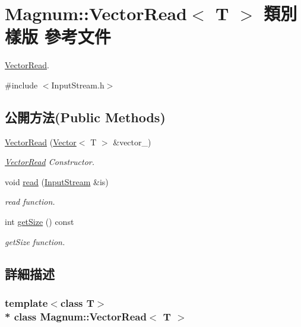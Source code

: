 \hypertarget{class_magnum_1_1_vector_read}{}\section{Magnum\+:\+:Vector\+Read$<$ T $>$ 類別 樣版 參考文件}
\label{class_magnum_1_1_vector_read}


\hyperlink{class_magnum_1_1_vector_read}{Vector\+Read}.  




{\ttfamily \#include $<$Input\+Stream.\+h$>$}

\subsection*{公開方法(Public Methods)}
\begin{DoxyCompactItemize}
\item 
\hyperlink{class_magnum_1_1_vector_read_a142de33b4e2e2a5f44930204be9c8f56}{Vector\+Read} (\hyperlink{class_magnum_1_1_vector}{Vector}$<$ T $>$ \&vector\+\_\+)
\begin{DoxyCompactList}\small\item\em \hyperlink{class_magnum_1_1_vector_read}{Vector\+Read} Constructor. \end{DoxyCompactList}\item 
void \hyperlink{class_magnum_1_1_vector_read_a9b27a68c51b6dbf396a25b753bbfbf7a}{read} (\hyperlink{class_magnum_1_1_input_stream}{Input\+Stream} \&is)
\begin{DoxyCompactList}\small\item\em read function. \end{DoxyCompactList}\item 
int \hyperlink{class_magnum_1_1_vector_read_a53cbc8a5baaefef7a6df405af73cc36f}{get\+Size} () const 
\begin{DoxyCompactList}\small\item\em get\+Size function. \end{DoxyCompactList}\end{DoxyCompactItemize}


\subsection{詳細描述}
\subsubsection*{template$<$class T$>$\\*
class Magnum\+::\+Vector\+Read$<$ T $>$}

